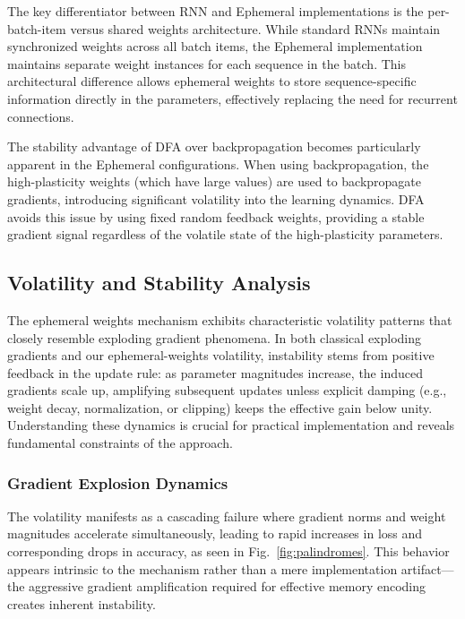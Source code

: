 \documentclass[conference]{IEEEtran}
\begin{document}
The key differentiator between RNN and Ephemeral implementations is the per-batch-item versus shared weights architecture. While standard RNNs maintain synchronized weights across all batch items, the Ephemeral implementation maintains separate weight instances for each sequence in the batch. This architectural difference allows ephemeral weights to store sequence-specific information directly in the parameters, effectively replacing the need for recurrent connections.

The stability advantage of DFA over backpropagation becomes particularly apparent in the Ephemeral configurations. When using backpropagation, the high-plasticity weights (which have large values) are used to backpropagate gradients, introducing significant volatility into the learning dynamics. DFA avoids this issue by using fixed random feedback weights, providing a stable gradient signal regardless of the volatile state of the high-plasticity parameters.

\subsection{Volatility and Stability Analysis}

The ephemeral weights mechanism exhibits characteristic volatility patterns that closely resemble exploding gradient phenomena. In both classical exploding gradients and our ephemeral-weights volatility, instability stems from positive feedback in the update rule: as parameter magnitudes increase, the induced gradients scale up, amplifying subsequent updates unless explicit damping (e.g., weight decay, normalization, or clipping) keeps the effective gain below unity. Understanding these dynamics is crucial for practical implementation and reveals fundamental constraints of the approach.

\subsubsection{Gradient Explosion Dynamics}

The volatility manifests as a cascading failure where gradient norms and weight magnitudes accelerate simultaneously, leading to rapid increases in loss and corresponding drops in accuracy, as seen in Fig.~\ref{fig:palindromes}. This behavior appears intrinsic to the mechanism rather than a mere implementation artifact—the aggressive gradient amplification required for effective memory encoding creates inherent instability.
\end{document}
